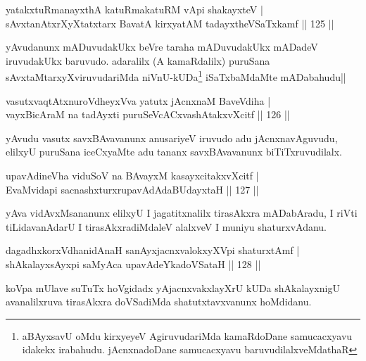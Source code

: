 
\begin{shl}
yatakxtuRmanayxthA katuRmakatuRM vA\s pi shakayxteV |\\
sAvxtanAtxrXyXtatxtarx BavatA kirxyatAM tadayxtheVSaTxkamf \hfill || 125 ||
\end{shl}

\begin{artha}
yAvudanunx mADuvudakUkx beVre taraha mADuvudakUkx mADadeV iruvudakUkx baruvudo. adaralilx (A kamaRdalilx) puruSana sAvxtaMtarxyXviruvudariMda niVnU-kUDa\footnote[1]{aBAyxsavU oMdu kirxyeyeV AgiruvudariMda kamaRdoDane samucacxyavu idakekx irabahudu. jAcnxnadoDane samucacxyavu baruvudilalxveMdathaR} iSaTxbaMdaMte mADabahudu||
\end{artha}

\begin{shl}
vasutxvaqtAtxnuroVdheyxVva yatutx jAcnxnaM BaveVdiha |\\
vayxBicAraM na tadAyxti puruSeVcACxvashAtakxvXcitf \hfill || 126 ||
\end{shl}	

\begin{artha}
yAvudu vasutx savxBAvavanunx anusariyeV iruvudo adu jAcnxnavAguvudu, elilxyU puruSana iceCxyaMte adu tananx savxBAvavanunx biTiTxruvudilalx.
\end{artha}

\begin{shl}
\footnotemark[2]{}upavAdineVha viduSoV na BAvayxM kasayxcitakxvXcitf |\\
EvaMvidapi sacnashxturxrupavAdAdaBUdayxtaH \hfill || 127 ||
\end{shl}

\begin{artha}
yAva vidAvxMsananunx elilxyU I jagatitxnalilx tirasAkxra mADabAradu, I riVti tiLidavanAdarU I tirasAkxradiMdaleV alalxveV I muniyu shaturxvAdanu.
\end{artha}

\begin{shl}
dagadhxkorxVdhanidAnaH sanAyxjacnxvalokxyXV\s pi shaturxtAmf |\\
shAkalayxsAyxpi saMyAca upavAdeYkadoVSataH \hfill || 128 ||
\end{shl}

\begin{artha}
koVpa mUlave suTuTx hoVgidadx yAjacnxvakxlayXrU kUDa shAkalayxnigU avanalilxruva tirasAkxra doVSadiMda shatutxtavxvanunx hoMdidanu.
\end{artha}%


